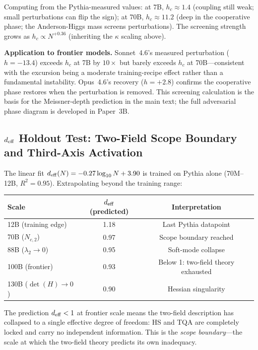 \documentclass[11pt]{article}
\begin{document}
Computing from the Pythia-measured values:
at 7B, $h_c \approx 1.4$ (coupling still weak; small perturbations can flip the sign);
at 70B, $h_c \approx 11.2$ (deep in the cooperative phase; the Anderson-Higgs mass screens perturbations).
The screening strength grows as $h_c \propto N^{+0.36}$ (inheriting the $\kappa$ scaling above).

\textbf{Application to frontier models.}
Sonnet~4.6's measured perturbation ($h = -13.4$) exceeds $h_c$ at 7B by $10\times$ but barely exceeds $h_c$ at 70B---consistent with the excursion being a moderate training-recipe effect rather than a fundamental instability.
Opus~4.6's recovery ($h = +2.8$) confirms the cooperative phase restores when the perturbation is removed.
This screening calculation is the basis for the Meissner-depth prediction in the main text; the full adversarial phase diagram is developed in Paper~3B.

\subsection{$d_{\rm eff}$ Holdout Test: Two-Field Scope Boundary and Third-Axis Activation}

The linear fit $d_{\rm eff}(N) = -0.27\log_{10}N + 3.90$ is trained on Pythia alone (70M--12B, $R^2 = 0.95$).
Extrapolating beyond the training range:
\begin{center}
\begin{tabular}{lcc}
\hline
Scale & $d_{\rm eff}$ (predicted) & Interpretation \\
\hline
12B (training edge) & 1.18 & Last Pythia datapoint \\
70B ($N_{c,2}$)     & 0.97 & Scope boundary reached \\
88B ($\lambda_2 \to 0$) & 0.95 & Soft-mode collapse \\
100B (frontier)     & 0.93 & Below 1: two-field theory exhausted \\
130B ($\det(H) \to 0$) & 0.90 & Hessian singularity \\
\hline
\end{tabular}
\end{center}

The prediction $d_{\rm eff} < 1$ at frontier scale means the two-field description has collapsed to a single effective degree of freedom: HS and TQA are completely locked and carry no independent information.
This is the \emph{scope boundary}---the scale at which the two-field theory predicts its own inadequacy.
\end{document}
